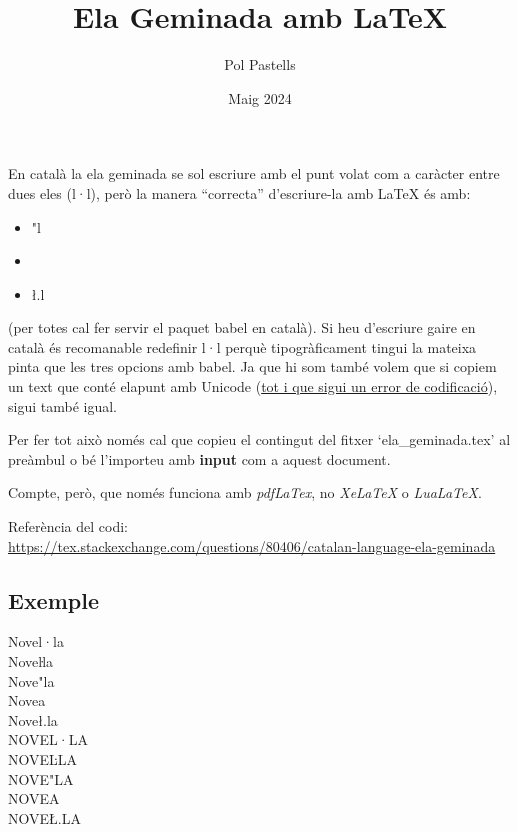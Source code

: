 \documentclass{article}
\title{Ela Geminada amb \LaTeX}
\date{Maig 2024}
\author{Pol Pastells}
\begin{document}
\maketitle

En català la ela geminada se sol escriure amb el punt volat com a caràcter entre dues eles (l·l), però la manera ``correcta'' d'escriure-la amb \LaTeX{} és amb:
\begin{itemize}
    \item "l 
    \item \lgem{}
    \item \l.l
\end{itemize}
(per totes cal fer servir el paquet babel en català). Si heu d'escriure gaire en català és recomanable redefinir l·l perquè tipogràficament tingui la mateixa pinta que les tres opcions amb babel.
Ja que hi som també volem que si copiem un text que conté elapunt amb Unicode (\href{http://www.l·l.cat/info/formes-erronies-descriure-la-ela-geminada}{tot i que sigui un error de codificació}), sigui també igual.

Per fer tot això només cal que copieu el contingut del fitxer `ela\_geminada.tex' al preàmbul o bé l'importeu amb \textbf{input} com a aquest document.

Compte, però, que només funciona amb \textit{pdfLaTex}, no \textit{XeLaTeX} o \textit{LuaLaTeX}.

Referència del codi:\\
\url{https://tex.stackexchange.com/questions/80406/catalan-language-ela-geminada}

\subsection*{Exemple}
Novel·la \\
Noveŀla \\
Nove"la \\
Nove\lgem a \\
Nove\l.la \\
NOVEL·LA \\
NOVEĿLA \\
NOVE"LA \\
NOVE\Lgem A \\
NOVE\L.LA
\end{document}
